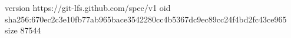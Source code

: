 version https://git-lfs.github.com/spec/v1
oid sha256:670ec2c3e10fb77ab965bace3542280cc4b5367dc9ec89cc24f4bd2fc43ce965
size 87544
